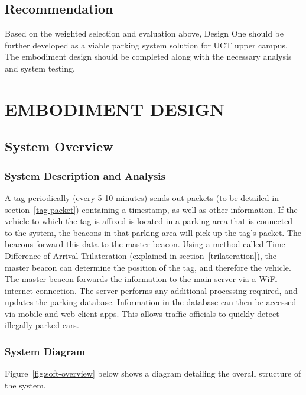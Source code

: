 \subsection{Recommendation}
Based on the weighted selection and evaluation above, Design One should be further developed as a viable parking system solution for UCT upper campus. The embodiment design should be completed along with the necessary analysis and system testing.

\newpage
\section{EMBODIMENT DESIGN}
\subsection{System Overview}

\subsubsection{System Description and Analysis}
A tag periodically (every 5-10 minutes) sends out packets (to be detailed in section~\ref{tag-packet}) containing a timestamp, as well as other information. If the vehicle to which the tag is affixed is located in a parking area that is connected to the system, the beacons in that parking area will pick up the tag's packet. The beacons forward this data to the master beacon. Using a method called Time Difference of Arrival Trilateration (explained in section~\ref{trilateration}), the master beacon can determine the position of the tag, and therefore the vehicle.
The master beacon forwards the information to the main server via a WiFi internet connection. The server performs any additional processing required, and updates the parking database. Information in the database can then be accessed via mobile and web client apps. This allows traffic officials to quickly detect illegally parked cars.

\subsubsection{System Diagram}
Figure~\ref{fig:soft-overview} below shows a diagram detailing the overall structure of the system. 

